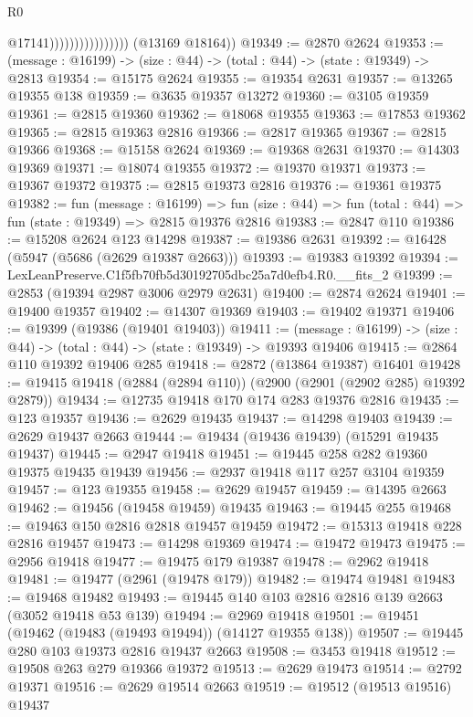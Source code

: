 \begin{lexlean}{R0}
\begin{coremodule}
                                      @17141))))))))))))))))
      (@13169 @18164))
@19349 := @2870 @2624
@19353 := (message : @16199) -> (size : @44) -> (total : @44) -> (state : @19349) -> @2813
@19354 := @15175 @2624
@19355 := @19354 @2631
@19357 := @13265 @19355 @138
@19359 := @3635 @19357 @13272
@19360 := @3105 @19359
@19361 := @2815 @19360
@19362 := @18068 @19355
@19363 := @17853 @19362
@19365 := @2815 @19363 @2816
@19366 := @2817 @19365
@19367 := @2815 @19366
@19368 := @15158 @2624
@19369 := @19368 @2631
@19370 := @14303 @19369
@19371 := @18074 @19355
@19372 := @19370 @19371
@19373 := @19367 @19372
@19375 := @2815 @19373 @2816
@19376 := @19361 @19375
@19382 := fun (message : @16199) =>
  fun (size : @44) => fun (total : @44) => fun (state : @19349) => @2815 @19376 @2816
@19383 := @2847 @110
@19386 := @15208 @2624 @123 @14298
@19387 := @19386 @2631
@19392 := @16428 (@5947 (@5686 (@2629 @19387 @2663)))
@19393 := @19383 @19392
@19394 := LexLeanPreserve.C1f5fb70fb5d30192705dbc25a7d0efb4.R0.__fits_2
@19399 := @2853 (@19394 @2987 @3006 @2979 @2631)
@19400 := @2874 @2624
@19401 := @19400 @19357
@19402 := @14307 @19369
@19403 := @19402 @19371
@19406 := @19399 (@19386 (@19401 @19403))
@19411 := (message : @16199) -> (size : @44) -> (total : @44) -> (state : @19349) -> @19393 @19406
@19415 := @2864 @110 @19392 @19406 @285
@19418 := @2872 (@13864 @19387) @16401
@19428 := @19415 @19418 (@2884 (@2894 @110)) (@2900 (@2901 (@2902 @285) @19392 @2879))
@19434 := @12735 @19418 @170 @174 @283 @19376 @2816
@19435 := @123 @19357
@19436 := @2629 @19435
@19437 := @14298 @19403
@19439 := @2629 @19437 @2663
@19444 := @19434 (@19436 @19439) (@15291 @19435 @19437)
@19445 := @2947 @19418
@19451 := @19445 @258 @282 @19360 @19375 @19435 @19439
@19456 := @2937 @19418 @117 @257 @3104 @19359
@19457 := @123 @19355
@19458 := @2629 @19457
@19459 := @14395 @2663
@19462 := @19456 (@19458 @19459) @19435
@19463 := @19445 @255
@19468 := @19463 @150 @2816 @2818 @19457 @19459
@19472 := @15313 @19418 @228 @2816 @19457
@19473 := @14298 @19369
@19474 := @19472 @19473
@19475 := @2956 @19418
@19477 := @19475 @179 @19387
@19478 := @2962 @19418
@19481 := @19477 (@2961 (@19478 @179))
@19482 := @19474 @19481
@19483 := @19468 @19482
@19493 := @19445 @140 @103 @2816 @2816 @139 @2663 (@3052 @19418 @53 @139)
@19494 := @2969 @19418
@19501 := @19451 (@19462 (@19483 (@19493 @19494)) (@14127 @19355 @138))
@19507 := @19445 @280 @103 @19373 @2816 @19437 @2663
@19508 := @3453 @19418
@19512 := @19508 @263 @279 @19366 @19372
@19513 := @2629 @19473
@19514 := @2792 @19371
@19516 := @2629 @19514 @2663
@19519 := @19512 (@19513 @19516) @19437

\end{coremodule}
\end{lexlean}
